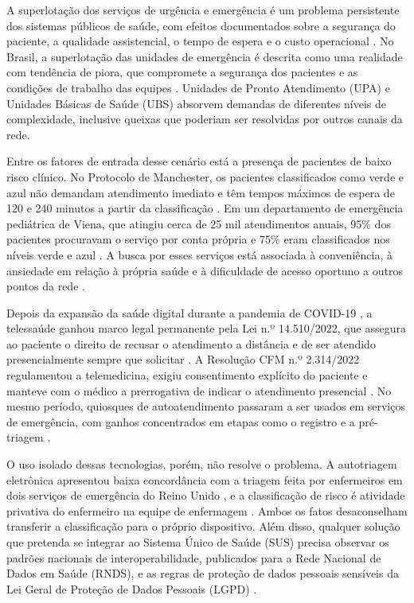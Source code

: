 \label{sec:introducao}

A superlotação dos serviços de urgência e emergência é um problema persistente dos sistemas públicos de saúde, com efeitos documentados sobre a segurança do paciente, a qualidade assistencial, o tempo de espera e o custo operacional \cite{savioli2022, pearce2023}. No Brasil, a superlotação das unidades de emergência é descrita como uma realidade com tendência de piora, que compromete a segurança dos pacientes e as condições de trabalho das equipes \cite{freitas2024}. Unidades de Pronto Atendimento (UPA) e Unidades Básicas de Saúde (UBS) absorvem demandas de diferentes níveis de complexidade, inclusive queixas que poderiam ser resolvidas por outros canais da rede.

Entre os fatores de entrada desse cenário está a presença de pacientes de baixo risco clínico. No Protocolo de Manchester, os pacientes classificados como verde e azul não demandam atendimento imediato e têm tempos máximos de espera de 120 e 240 minutos a partir da classificação \cite{stormversloot2014}. Em um departamento de emergência pediátrica de Viena, que atingiu cerca de 25 mil atendimentos anuais, 95\% dos pacientes procuravam o serviço por conta própria e 75\% eram classificados nos níveis verde e azul \cite{sorznechay2025}. A busca por esses serviços está associada à conveniência, à ansiedade em relação à própria saúde e à dificuldade de acesso oportuno a outros pontos da rede \cite{schmiedhofer2016}.

Depois da expansão da saúde digital durante a pandemia de COVID-19 \cite{donida2021, ndayishimiye2023}, a telessaúde ganhou marco legal permanente pela Lei n.º 14.510/2022, que assegura ao paciente o direito de recusar o atendimento a distância e de ser atendido presencialmente sempre que solicitar \cite{lei14510}. A Resolução CFM n.º 2.314/2022 regulamentou a telemedicina, exigiu consentimento explícito do paciente e manteve com o médico a prerrogativa de indicar o atendimento presencial \cite{cfm2314}. No mesmo período, quiosques de autoatendimento passaram a ser usados em serviços de emergência, com ganhos concentrados em etapas como o registro e a pré-triagem \cite{joseph2023}.

O uso isolado dessas tecnologias, porém, não resolve o problema. A autotriagem eletrônica apresentou baixa concordância com a triagem feita por enfermeiros em dois serviços de emergência do Reino Unido \cite{dickson2022}, e a classificação de risco é atividade privativa do enfermeiro na equipe de enfermagem \cite{cofen661}. Ambos os fatos desaconselham transferir a classificação para o próprio dispositivo. Além disso, qualquer solução que pretenda se integrar ao Sistema Único de Saúde (SUS) precisa observar os padrões nacionais de interoperabilidade, publicados para a Rede Nacional de Dados em Saúde (RNDS), e as regras de proteção de dados pessoais sensíveis da Lei Geral de Proteção de Dados Pessoais (LGPD) \cite{portaria1434, lgpd2018, leme2020}.

